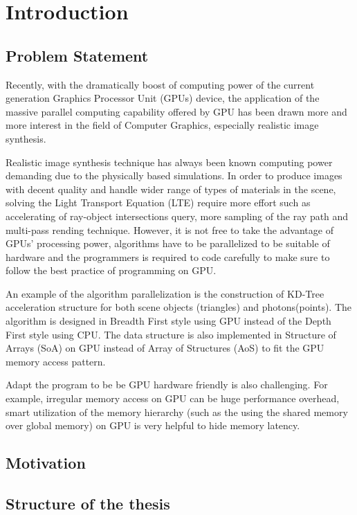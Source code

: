 \chapter{Introduction}

\section{Problem Statement}

Recently, with the dramatically boost of computing power of the current generation Graphics Processor Unit (GPUs) device, the application of the massive parallel computing capability offered by GPU has been drawn more and more interest in the field of Computer Graphics, especially realistic image synthesis.  

Realistic image synthesis technique has always been known computing power demanding due to the physically based simulations. In order to produce images with decent quality and handle wider range of types of materials in the scene, solving the Light Transport  Equation (LTE) require more effort such as accelerating of ray-object intersections query, more sampling of the ray path and multi-pass rending technique. However, it is not free to take the advantage of GPUs' processing power, algorithms have to be parallelized to be suitable of hardware and the programmers is required to code carefully to make sure to follow the best practice of programming on GPU. 

An example of the algorithm parallelization is the construction of KD-Tree acceleration structure for both scene objects (triangles) and photons(points). The algorithm is designed in Breadth First style using GPU instead of the Depth First style using CPU. The data structure is also implemented in Structure of Arrays (SoA) on GPU instead of Array of Structures (AoS) to fit the GPU memory access pattern. 

Adapt the program to be be GPU hardware friendly is also challenging. For example, irregular memory access on GPU can be huge performance overhead, smart utilization of the memory hierarchy (such as the using the shared memory over global memory) on GPU is very helpful to hide memory latency. 


\section{Motivation}


\section{Structure of the thesis}	



